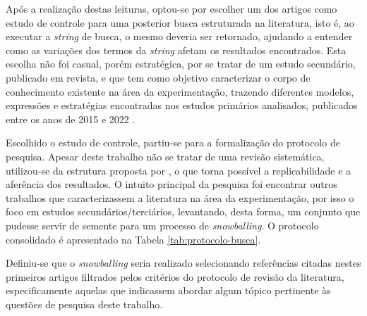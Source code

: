Após a realização destas leituras, optou-se por escolher um dos artigos como estudo de controle para uma posterior busca estruturada na literatura, isto é, ao executar a \textit{string} de busca, o mesmo deveria ser retornado, ajudando a entender como as variações dos termos da \textit{string} afetam os resultados encontrados. Esta escolha não foi casual, porém estratégica, por se tratar de um estudo secundário, publicado em revista, e que tem como objetivo caracterizar o corpo de conhecimento existente na área da experimentação, trazendo diferentes modelos, expressões e estratégias encontradas nos estudos primários analisados, publicados entre os anos de 2015 e 2022 \cite{erthal_characterization_2023}.


Escolhido o estudo de controle, partiu-se para a formalização do protocolo de pesquisa. Apesar deste trabalho não se tratar de uma revisão sistemática, utilizou-se da estrutura proposta por , o que torna possível a replicabilidade e a aferência dos resultados. O intuito principal da pesquisa foi encontrar outros trabalhos que caracterizassem a literatura na área da experimentação, por isso o foco em estudos secundários/terciários, levantando, desta forma, um conjunto que pudesse servir de semente para um processo de \textit{snowballing}. O protocolo consolidado é apresentado na Tabela \ref{tab:protocolo-busca}.

Definiu-se que o \textit{snowballing} seria realizado selecionando referências citadas nestes primeiros artigos filtrados pelos critérios do protocolo de revisão da literatura, especificamente aquelas que indicassem abordar algum tópico pertinente às questões de pesquisa deste trabalho.


